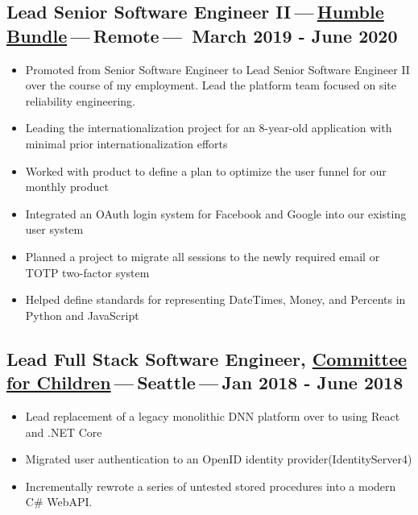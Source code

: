\documentclass[11pt]{amsart}
\begin{document}
\hypertarget{x-lead-senior-software-engineer-ii — \href{https://www.humblebundle.com}{humble-bundle} — remote — -march-2019---june-2020}{\subsection*{Lead Senior Software Engineer II — \href{https://www.humblebundle.com}{Humble Bundle} — Remote —  March 2019 - June 2020}}
\begin{itemize}

\item Promoted from Senior Software Engineer to Lead Senior Software Engineer II over the course of my employment. Lead the platform team focused on site reliability engineering.

\item Leading the internationalization project for an 8-year-old application with minimal prior internationalization efforts

\item Worked with product to define a plan to optimize the user funnel for our monthly product

\item Integrated an OAuth login system for Facebook and Google into our existing user system

\item Planned a project to migrate all sessions to the newly required email or TOTP two-factor system

\item Helped define standards for representing DateTimes, Money, and Percents in Python and JavaScript

\end{itemize}


\hypertarget{x-lead-full-stack-software-engineer,-\href{https://www.cfchildren.org}{committee-for-children} — seattle — jan-2018---june-2018}{\subsection*{Lead Full Stack Software Engineer, \href{https://www.cfchildren.org}{Committee for Children} — Seattle — Jan 2018 - June 2018}}
\begin{itemize}

\item Lead replacement of a legacy monolithic DNN platform over to using React and .NET Core

\item Migrated user authentication to an OpenID identity provider(IdentityServer4)

\item Incrementally rewrote a series of untested stored procedures into a modern C# WebAPI.

\end{itemize}
\end{document}
